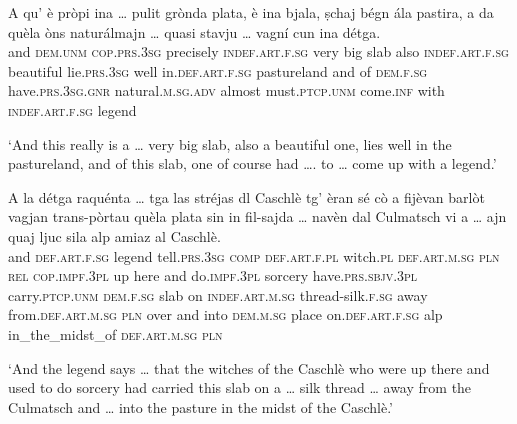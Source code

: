 \begin{linenumbers}
\gll    A qu’ è pròpi ina … pulit grònda plata, è ina bjala, ṣchaj bégn ála pastira, a da quèla òns naturálmajn … quasi stavju … vagní cun ina détga.\\
 and \textsc{dem.unm} \textsc{cop.prs.3sg} precisely \textsc{indef.art.f.sg} {} very big slab also \textsc{indef.art.f.sg} beautiful lie.\textsc{prs.3sg} well in.\textsc{def.art.f.sg} pastureland and of \textsc{dem.f.sg} have.\textsc{prs.3sg.gnr} natural.\textsc{m.sg.adv} {} almost must.\textsc{ptcp.unm} {} come.\textsc{inf} with \textsc{indef.art.f.sg} legend\\
\end{linenumbers}
\medskip
\glt `And this really is a … very big slab, also a beautiful one, lies well in the pastureland, and of this slab, one of course had …. to … come up with a legend.'
\medskip

\begin{linenumbers}
\gll    A la détga raquénta … tga las stréjas dl Caschlè tg’ èran sé cò a fijèvan barlòt vagjan trans-pòrtau quèla plata sin\footnotemark{} in fil-sajda … navèn dal Culmatsch vi a … ajn quaj ljuc sila alp amiaz al Caschlè.\\
and \textsc{def.art.f.sg} legend tell.\textsc{prs.3sg} {} \textsc{comp} \textsc{def.art.f.pl} witch.\textsc{pl} \textsc{def.art.m.sg} \textsc{pln} \textsc{rel} \textsc{cop.impf.3pl} up here and do.\textsc{impf.3pl} sorcery have.\textsc{prs.sbjv.3pl} carry.\textsc{ptcp.unm} \textsc{dem.f.sg} slab on \textsc{indef.art.m.sg} thread-silk.\textsc{f.sg} {} away from.\textsc{def.art.m.sg} \textsc{pln} over and {} into \textsc{dem.m.sg} place on.\textsc{def.art.f.sg} alp in\_the\_midst\_of \textsc{def.art.m.sg} \textsc{pln}\\
\end{linenumbers}
\medskip
\glt `And the legend says … that the witches of the Caschlè who were up there and used to do sorcery had carried this slab on a … silk thread … away from the Culmatsch and … into the pasture in the midst of the Caschlè.'
\medskip

